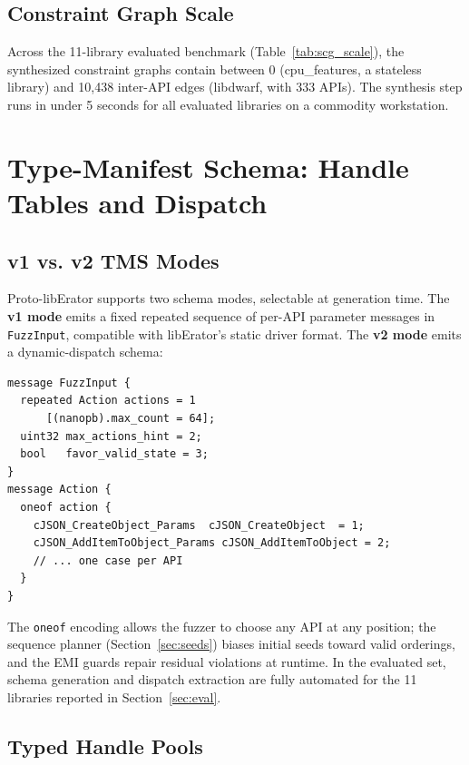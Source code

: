 \documentclass[sigconf,anonymous]{acmart}
\begin{document}
\subsection{Constraint Graph Scale}

Across the 11-library evaluated benchmark (Table~\ref{tab:scg_scale}),
the synthesized constraint graphs contain between 0 (cpu\_features, a
stateless library) and 10,438 inter-API edges (libdwarf, with 333 APIs).
The synthesis step runs in under 5 seconds for all evaluated libraries on
a commodity workstation.

\section{Type-Manifest Schema: Handle Tables and Dispatch}
\label{sec:schema}

\subsection{v1 vs. v2 TMS Modes}

Proto-libErator supports two schema modes, selectable at generation time.
The \textbf{v1 mode} emits a fixed repeated sequence of per-API parameter
messages in \texttt{FuzzInput}, compatible with libErator's static driver
format.  The \textbf{v2 mode} emits a dynamic-dispatch schema:

\begin{lstlisting}[language={}, caption={v2 FuzzInput schema (simplified).}]
message FuzzInput {
  repeated Action actions = 1
      [(nanopb).max_count = 64];
  uint32 max_actions_hint = 2;
  bool   favor_valid_state = 3;
}
message Action {
  oneof action {
    cJSON_CreateObject_Params  cJSON_CreateObject  = 1;
    cJSON_AddItemToObject_Params cJSON_AddItemToObject = 2;
    // ... one case per API
  }
}
\end{lstlisting}

The \texttt{oneof} encoding allows the fuzzer to choose any API at any
position; the sequence planner (Section~\ref{sec:seeds}) biases initial
seeds toward valid orderings, and the EMI guards repair residual violations
at runtime. In the evaluated set, schema generation and dispatch extraction
are fully automated for the 11 libraries reported in Section~\ref{sec:eval}.

\subsection{Typed Handle Pools}
\end{document}
